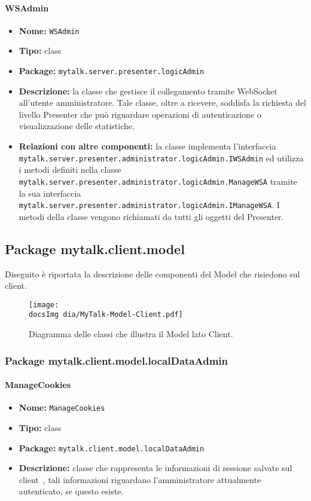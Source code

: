 \paragraph{WSAdmin}{
	\begin{itemize}
		\item [] \textbf{Nome:} \texttt{WSAdmin}
		\item [] \textbf{Tipo:} class
		\item [] \textbf{Package:} \texttt{mytalk.server.presenter.logicAdmin}
		\item [] \textbf{Descrizione:} la classe che gestisce il collegamento tramite WebSocket\g~ all'utente amministratore. Tale classe, oltre a ricevere, soddisfa la richiesta del livello Presenter che può riguardare operazioni di autenticazione o visualizzazione delle statistiche.
		\item [] \textbf{Relazioni con altre componenti:} la classe implementa l'interfaccia\\ \texttt{mytalk.server.presenter.administrator.logicAdmin.IWSAdmin} ed utilizza i metodi definiti nella classe\\ \texttt{mytalk.server.presenter.administrator.logicAdmin.ManageWSA} tramite la sua interfaccia\\ \texttt{mytalk.server.presenter.administrator.logicAdmin.IManageWSA}. I metodi della classe vengono richiamati da tutti gli oggetti del Presenter.
	\end{itemize}
}


\subsection{Package mytalk.client.model}
\noindent Diseguito è riportata la descrizione delle componenti del Model che risiedono sul client\g.

	\begin{figure}[h!tbp]
		\centering
		\texttt{[image: \\docsImg dia/MyTalk-Model-Client.pdf]}
		\caption{Diagramma delle classi che illustra il Model lato Client.}
	\end{figure}

\subsubsection{Package mytalk.client.model.localDataAdmin}

\paragraph{ManageCookies}{
	\begin{itemize}
		\item [] \textbf{Nome:} \texttt{ManageCookies}
		\item [] \textbf{Tipo:} class
		\item [] \textbf{Package:} \texttt{mytalk.client.model.localDataAdmin}
		\item [] \textbf{Descrizione:}{ classe che rappresenta le informazioni di sessione salvate sul client\g~, tali informazioni riguardano l'amministratore attualmente autenticato, se questo esiste.}
	\end{itemize}
}

